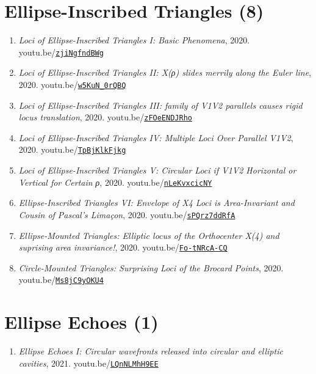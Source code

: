 \documentclass[12pt]{article}
\begin{document}
\section{Ellipse-Inscribed Triangles (8)}

\begin{enumerate}[resume]
\item \textit{Loci of Ellipse-Inscribed Triangles I: Basic Phenomena}, 2020. youtu.be/\href{https://youtu.be/zjiNgfndBWg}{\nolinkurl{zjiNgfndBWg}}
\item \textit{Loci of Ellipse-Inscribed Triangles II: X(ρ) slides merrily along the Euler line}, 2020. youtu.be/\href{https://youtu.be/w5KuN_0rQBQ}{\nolinkurl{w5KuN\_0rQBQ}}
\item \textit{Loci of Ellipse-Inscribed Triangles III: family of V1V2 parallels causes rigid locus translation}, 2020. youtu.be/\href{https://youtu.be/zFOeENDJRho}{\nolinkurl{zFOeENDJRho}}
\item \textit{Loci of Ellipse-Inscribed Triangles IV: Multiple Loci Over Parallel V1V2}, 2020. youtu.be/\href{https://youtu.be/TpBjKlkFjkg}{\nolinkurl{TpBjKlkFjkg}}
\item \textit{Loci of Ellipse-Inscribed Triangles V: Circular Loci if V1V2 Horizontal or Vertical for Certain ρ}, 2020. youtu.be/\href{https://youtu.be/nLeKvxcicNY}{\nolinkurl{nLeKvxcicNY}}
\item \textit{Ellipse-Inscribed Triangles VI: Envelope of X4 Loci is Area-Invariant and Cousin of Pascal's Limaçon}, 2020. youtu.be/\href{https://youtu.be/sPQrz7ddRfA}{\nolinkurl{sPQrz7ddRfA}}
\item \textit{Ellipse-Mounted Triangles: Elliptic locus of the Orthocenter X(4) and suprising area invariance!}, 2020. youtu.be/\href{https://youtu.be/Fo-tNRcA-CQ}{\nolinkurl{Fo-tNRcA-CQ}}
\item \textit{Circle-Mounted Triangles: Surprising Loci of the Brocard Points}, 2020. youtu.be/\href{https://youtu.be/Ms8jC9yOKU4}{\nolinkurl{Ms8jC9yOKU4}}
\end{enumerate}

\section{Ellipse Echoes (1)}

\begin{enumerate}[resume]
\item \textit{Ellipse Echoes I: Circular wavefronts released into circular and elliptic cavities}, 2021. youtu.be/\href{https://youtu.be/LQnNLMhH9EE}{\nolinkurl{LQnNLMhH9EE}}
\end{enumerate}
\end{document}
